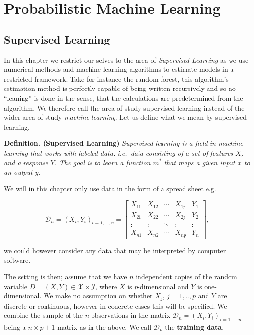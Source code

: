\documentclass[a4paper,10pt,openany]{book}
\begin{document}
\hypertarget{probabilistic-machine-learning}{%
\chapter{Probabilistic Machine Learning}\label{probabilistic-machine-learning}}

\hypertarget{supervised-learning}{%
\section{Supervised Learning}\label{supervised-learning}}

In this chapter we restrict our selves to the area of \emph{Supervised Learning} as we use numerical methods and machine learning algorithms to estimate models in a restricted framework. Take for instance the random forest, this algorithm's estimation method is perfectly capable of being written recursively and so no ``leaning'' is done in the sense, that the calculations are predetermined from the algorithm. We therefore call the area of study supervised learning instead of the wider area of study \emph{machine learning}. Let us define what we mean by supervised learning.

\textbf{Definition. (Supervised Learning)} \emph{Supervised learning is a field in machine learning that works with labeled data, i.e.~data consisting of a set of features \(X\), and a response \(Y\). The goal is to learn a function \(m^*\) that maps a given input \(x\) to an output \(y\).}

We will in this chapter only use data in the form of a spread sheet e.g.

\[
\mathcal{D}_n=
\left(X_i, Y_i \right)_{i=1,...,n}=
\left[
\begin{array}{cccc|c}
X_{11} & X_{12} & \cdots & X_{1p} & Y_1\\
X_{21} & X_{22} & \cdots & X_{2p} & Y_2\\
\vdots & \vdots & \ddots & \vdots & \vdots\\
X_{n1} & X_{n2} & \cdots & X_{np} & Y_n
\end{array}
\right],
\]

we could however consider any data that may be interpreted by computer software.

The setting is then; assume that we have \(n\) independent copies of the random variable \(D=(X,Y)\in \mathcal{X}\times \mathcal{Y}\), where \(X\) is \(p\)-dimensional and \(Y\) is one-dimensional. We make no assumption on whether \(X_j\), \(j=1,..,p\) and \(Y\) are discrete or continuous, however in concrete cases this will be specified. We combine the sample of the \(n\) observations in the matrix \(\mathcal{D}_n=(X_i,Y_i)_{i=1,...,n}\) being a \(n\times p+1\) matrix as in the above. We call \(\mathcal{D}_n\) the \textbf{training data}.
\end{document}

